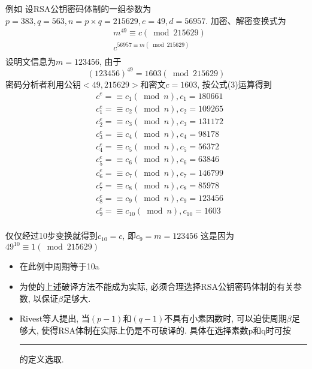 \documentclass[UTF8]{ctexart}
\newcommand\hl{\bgroup\markoverwith
  {\textcolor{yellow}{\rule[-.5ex]{2pt}{2.5ex}}}\ULon}
\begin{document}
\begin{itemize}
\begin{itemize}
            例如 设RSA公钥密码体制的一组参数为$p=383, q=563, n=p\times q=215629, e=49, d=56957$. 加密、解密变换式为
            $$
            \begin{aligned}
                &m^{49}\equiv c(\bmod 215629)\\
                &c^{56957\equiv m(\bmod 215629)}\\
            \end{aligned}
            $$
            设明文信息为$m=123456$, 由于
            $$(123456)^{49}=1603(\bmod 215629)$$
            密码分析者利用公钥$<49, 215629>$和密文$c=1603$, 按公式(3)运算得到
            $$
            \begin{aligned}
                &c^e=\equiv c_1(\bmod n), c_1=180661\\
                &c^e_1=\equiv c_2(\bmod n), c_2=109265\\
                &c^e_2=\equiv c_3(\bmod n), c_3=131172\\
                &c^e_3=\equiv c_4(\bmod n), c_4=98178\\
                &c^e_4=\equiv c_5(\bmod n), c_5=56372\\
                &c^e_5=\equiv c_6(\bmod n), c_6=63846\\
                &c^e_6=\equiv c_7(\bmod n), c_7=146799\\
                &c^e_7=\equiv c_8(\bmod n), c_8=85978\\
                &c^e_8=\equiv c_9(\bmod n), c_9=123456\\
                &c^e_9=\equiv c_10(\bmod n), c_10=1603\\
            \end{aligned}
            $$

            仅仅经过10步变换就得到$c_{10}=c$, 即$c_9=m=123456$
            这是因为$49^{10}\equiv 1(\bmod 215629)$

            \begin{itemize}
                \item 在此例中周期等于10a
                \item 为使的上述破译方法不能成为实际, 必须合理选择RSA公钥密码体制的有关参数, 以保证$\beta$足够大.
                \item Rivest等人提出, 当$(p-1)$和$(q-1)$不具有小素因数时, 可以迫使周期$\beta$足够大, 使得RSA体制在实际上仍是不可破译的. 具体在选择素数p和q时可按\hl{强素数}的定义选取.
            \end{itemize}
        \end{itemize}
    \end{itemize}
\end{document}
